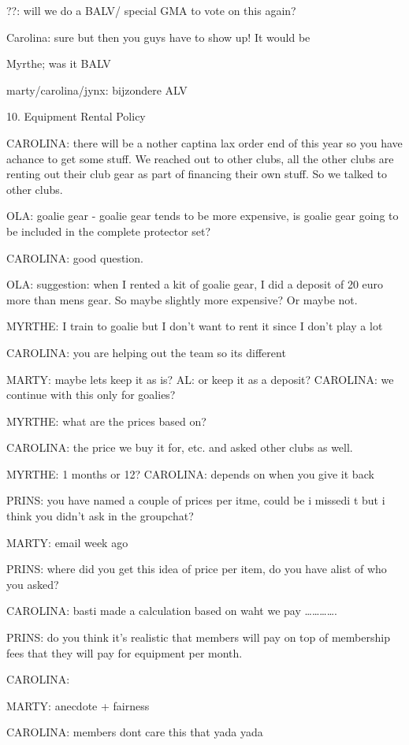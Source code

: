 \documentclass[12pt, a4paper]{article}
\begin{document}
??: will we do a BALV/ special GMA to vote on this again? 

Carolina: sure but then you guys have to show up! It would be 

Myrthe; was it BALV

marty/carolina/jynx: bijzondere ALV

10. Equipment Rental Policy

CAROLINA: there will be a nother captina lax order end of this year so you have achance to get some stuff. We reached out to other clubs, all the other clubs are renting out their club gear as part of financing their own stuff. So we talked to other clubs. 

OLA: goalie gear - goalie gear tends to be more expensive, is goalie gear going to be included in the complete protector set?

CAROLINA: good question.

OLA: suggestion: when I rented a kit of goalie gear, I did a deposit of 20 euro more than mens gear. So maybe slightly more expensive? Or maybe not.

MYRTHE: I train to goalie but I don’t want to rent it since I don’t play a lot

CAROLINA: you are helping out the team so  its different

MARTY: maybe lets keep it as is?
AL: or keep it as a deposit?
CAROLINA: we continue with this only for goalies?

MYRTHE: what are the prices based on?

CAROLINA: the price we buy it for, etc. and asked other clubs as well.

MYRTHE: 1 months or 12?
CAROLINA: depends on when you give it back

PRINS: you have named a couple of prices per itme, could be i missedi t but i think you didn’t ask in the groupchat? 

MARTY: email week ago

PRINS: where did you get this idea of price per item, do you have alist of who you asked?

CAROLINA: basti made a calculation based on waht we pay ………….

PRINS: do you think it’s realistic that members will pay on top of membership fees that they will pay for equipment per month.

CAROLINA:

MARTY: anecdote + fairness

CAROLINA: members dont care this that yada yada
\end{document}
